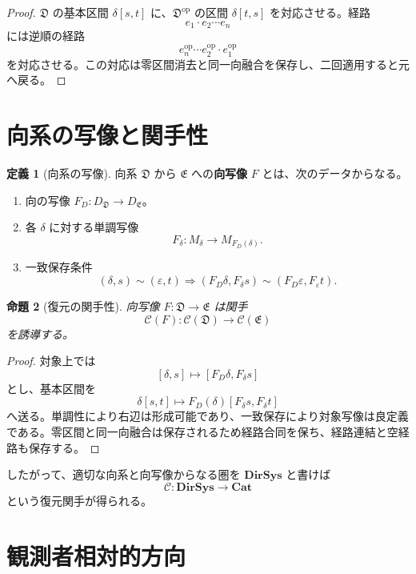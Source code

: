 \documentclass[a4paper,11pt]{ltjsarticle}
\theoremstyle{definition}
\newtheorem{definition}{定義}[section]
\theoremstyle{plain}
\newtheorem{proposition}[definition]{命題}
\newcommand{\Cat}{\mathbf{Cat}}
\begin{document}
\begin{proof}
$\mathfrak D$ の基本区間 $\delta[s,t]$ に、$\mathfrak D^{\mathrm{op}}$ の区間 $\delta[t,s]$ を対応させる。経路
\[
 e_1\cdot e_2\cdots e_n
\]
には逆順の経路
\[
 e_n^{\mathrm{op}}\cdots e_2^{\mathrm{op}}\cdot e_1^{\mathrm{op}}
\]
を対応させる。この対応は零区間消去と同一向融合を保存し、二回適用すると元へ戻る。
\end{proof}

\section{向系の写像と関手性}

\begin{definition}[向系の写像]
向系 $\mathfrak D$ から $\mathfrak E$ への\textbf{向写像} $F$ とは、次のデータからなる。
\begin{enumerate}
 \item 向の写像 $F_D:D_{\mathfrak D}\to D_{\mathfrak E}$。
 \item 各 $\delta$ に対する単調写像
 \[
  F_\delta:M_\delta\longrightarrow M_{F_D(\delta)}.
 \]
 \item 一致保存条件
 \[
  (\delta,s)\sim(\varepsilon,t)
  \Longrightarrow
  (F_D\delta,F_\delta s)
  \sim
  (F_D\varepsilon,F_\varepsilon t).
 \]
\end{enumerate}
\end{definition}

\begin{proposition}[復元の関手性]
向写像 $F:\mathfrak D\to\mathfrak E$ は関手
\[
 \mathcal C(F):
 \mathcal C(\mathfrak D)\longrightarrow
 \mathcal C(\mathfrak E)
\]
を誘導する。
\end{proposition}

\begin{proof}
対象上では
\[
 [\delta,s]\longmapsto
 [F_D\delta,F_\delta s]
\]
とし、基本区間を
\[
 \delta[s,t]\longmapsto
 F_D(\delta)[F_\delta s,F_\delta t]
\]
へ送る。単調性により右辺は形成可能であり、一致保存により対象写像は良定義である。零区間と同一向融合は保存されるため経路合同を保ち、経路連結と空経路も保存する。
\end{proof}

したがって、適切な向系と向写像からなる圏を $\mathbf{DirSys}$ と書けば
\[
 \mathcal C:\mathbf{DirSys}\longrightarrow\Cat
\]
という復元関手が得られる。

\section{観測者相対的方向}
\end{document}
